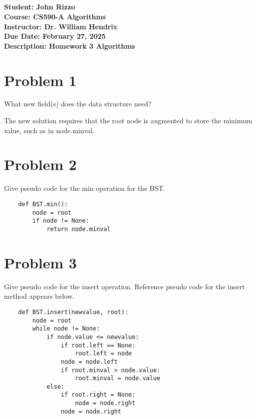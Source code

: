\documentclass[12pt, letterpaper]{article}
\title{\classname \\ \assignmentdescription}
\author{\studentname}
\date{\duedate}
\newcommand{\studentname}          {John Rizzo           }
\newcommand{\classname}            {CS590-A Algorithms   }
\newcommand{\professorname}        {Dr. William Hendrix  }
\newcommand{\assignmentdescription}{Homework 3 Algorithms}
\newcommand{\duedate}              {February 27, 2025     }
\begin{document}
\noindent
\normalsize \textbf{Student:     \studentname} \\ [5pt]
            \textbf{Course:      \classname} \\ [5pt]
            \textbf{Instructor:  \professorname} \\ [5pt]
            \textbf{Due Date:    \duedate} \\ [5pt]
            \textbf{Description: \assignmentdescription}

\vspace{0.5cm}

\section*{Problem 1}

What new field(s) does the data structure need?

\vspace{0.5cm}
\noindent
The new solution requires that the root node is augmented to store the minimum value, such as in node.minval.
\section*{Problem 2}

Give pseudo code for the min operation for the BST.


\begin{verbatim}
    def BST.min():
        node = root
        if node != None:
            return node.minval
\end{verbatim}

\section*{Problem 3}

Give pseudo code for the insert operation.  Reference pseudo code for the insert method appears below.

\begin{verbatim}
    def BST.insert(newvalue, root):
        node = root
        while node != None:
            if node.value <= newvalue:
                if root.left == None:
                    root.left = node
                node = node.left
                if root.minval > node.value:
                    root.minval = node.value
            else:
                if root.right = None:
                    node = node.right
                node = node.right
\end{verbatim}
\end{document}
